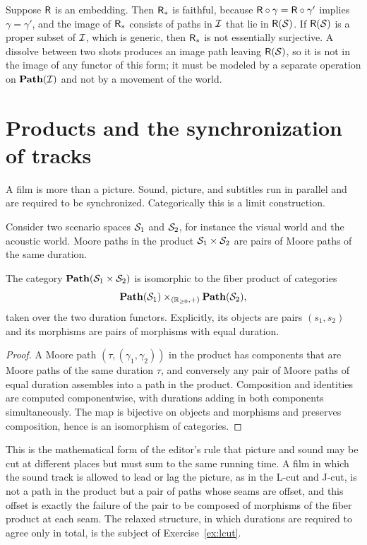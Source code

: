 \begin{example}
Suppose $\mathsf{R}$ is an embedding. Then $\mathsf{R}_*$ is faithful, because $\mathsf{R}\circ\gamma=\mathsf{R}\circ\gamma'$ implies $\gamma=\gamma'$, and the image of $\mathsf{R}_*$ consists of paths in $\mathcal{I}$ that lie in $\mathsf{R}(\mathcal{S})$. If $\mathsf{R}(\mathcal{S})$ is a proper subset of $\mathcal{I}$, which is generic, then $\mathsf{R}_*$ is not essentially surjective. A dissolve between two shots produces an image path leaving $\mathsf{R}(\mathcal{S})$, so it is not in the image of any functor of this form; it must be modeled by a separate operation on $\mathbf{Path}(\mathcal{I})$ and not by a movement of the world.
\end{example}

\section{Products and the synchronization of tracks}

A film is more than a picture. Sound, picture, and subtitles run in parallel and are required to be synchronized. Categorically this is a limit construction.

Consider two scenario spaces $\mathcal{S}_1$ and $\mathcal{S}_2$, for instance the visual world and the acoustic world. Moore paths in the product $\mathcal{S}_1\times\mathcal{S}_2$ are pairs of Moore paths of the same duration.

\begin{proposition}\label{prop:fiber}
The category $\mathbf{Path}(\mathcal{S}_1\times\mathcal{S}_2)$ is isomorphic to the fiber product of categories
\[
\mathbf{Path}(\mathcal{S}_1)\times_{(\mathbb{R}_{\ge0},+)}\mathbf{Path}(\mathcal{S}_2),
\]
taken over the two duration functors. Explicitly, its objects are pairs $(s_1,s_2)$ and its morphisms are pairs of morphisms with equal duration.
\end{proposition}

\begin{proof}
A Moore path $(\tau,(\gamma_1,\gamma_2))$ in the product has components that are Moore paths of the same duration $\tau$, and conversely any pair of Moore paths of equal duration assembles into a path in the product. Composition and identities are computed componentwise, with durations adding in both components simultaneously. The map is bijective on objects and morphisms and preserves composition, hence is an isomorphism of categories.
\end{proof}

This is the mathematical form of the editor's rule that picture and sound may be cut at different places but must sum to the same running time. A film in which the sound track is allowed to lead or lag the picture, as in the L-cut and J-cut, is not a path in the product but a pair of paths whose seams are offset, and this offset is exactly the failure of the pair to be composed of morphisms of the fiber product at each seam. The relaxed structure, in which durations are required to agree only in total, is the subject of Exercise~\ref{ex:lcut}.

